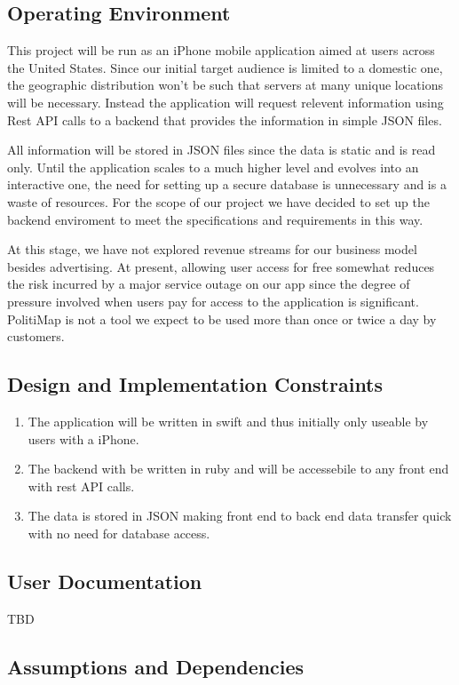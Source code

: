 \documentclass[12pt,oneside,letterpaper]{article}
\begin{document}
\subsection{Operating Environment}
This project will be run as an iPhone mobile application aimed at users across the United States. Since our initial target audience is limited to a domestic one, the geographic distribution won’t be such that servers at many unique locations will be necessary. Instead the application will request relevent information using Rest API calls to a backend that provides the information in simple JSON files. 

All information will be stored in JSON files since the data is static and is read only. Until the application scales to a much higher level and evolves into an interactive one, the need for setting up a secure database is unnecessary and is a waste of resources. For the scope of our project we have decided to set up the backend enviroment to meet the specifications and requirements in this way.

At this stage, we have not explored revenue streams for our business model besides advertising. At present, allowing user access for free somewhat reduces the risk incurred by a major service outage on our app since the degree of pressure involved when users pay for access to the application is significant. PolitiMap is not a tool we expect to be used more than once or twice a day by customers.

\subsection{Design and Implementation Constraints}
\begin{enumerate}
\item The application will be written in swift and thus initially only useable by users with a iPhone.
\item The backend with be written in ruby and will be accessebile to any front end with rest API calls.
\item The data is stored in JSON making front end to back end data transfer quick with no need for database access.
\end{enumerate}

\subsection{User Documentation}
TBD
\subsection{Assumptions and Dependencies}
\end{document}
